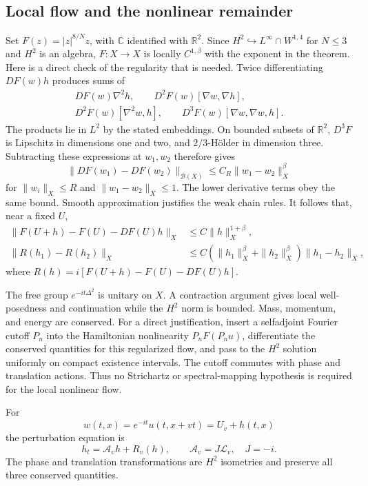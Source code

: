\subsection{Local flow and the nonlinear remainder}

Set $F(z)=|z|^{8/N}z$, with $\mathbb C$ identified with $\mathbb R^2$.
Since $H^2\hookrightarrow L^\infty\cap W^{1,4}$ for $N\le3$ and
$H^2$ is an algebra, $F:X\to X$ is locally $C^{1,\beta}$ with the
exponent in the theorem. Here is a direct check of the regularity that
is needed. Twice differentiating $DF(w)h$ produces sums of
\begin{gather*}
 DF(w)\nabla^2h,\qquad D^2F(w)[\nabla w,\nabla h],\\
 D^2F(w)[\nabla^2w,h],\qquad D^3F(w)[\nabla w,\nabla w,h].
\end{gather*}
The products lie in $L^2$ by the stated embeddings. On bounded subsets
of $\mathbb R^2$, $D^3F$ is Lipschitz in dimensions one and two, and
$2/3$-H\"older in dimension three. Subtracting these expressions at
$w_1,w_2$ therefore gives
\[
 \|DF(w_1)-DF(w_2)\|_{\mathcal B(X)}
       \le C_R\|w_1-w_2\|_X^\beta
\]
for $\|w_i\|_X\le R$ and $\|w_1-w_2\|_X\le1$.
The lower derivative terms obey the same bound. Smooth approximation
justifies the weak chain rules. It follows that, near a fixed $U$,
\begin{align}
 \|F(U+h)-F(U)-DF(U)h\|_X&\le C\|h\|_X^{1+\beta},
 \label{eq:r12-remainder}\\
 \|R(h_1)-R(h_2)\|_X
 &\le C(\|h_1\|_X^\beta+\|h_2\|_X^\beta)\|h_1-h_2\|_X,
 \label{eq:r12-remainder-lipschitz}
\end{align}
where $R(h)=i[F(U+h)-F(U)-DF(U)h]$.

The free group $e^{-it\Delta^2}$ is unitary on $X$. A contraction
argument gives local well-posedness and continuation while the $H^2$
norm is bounded. Mass, momentum, and energy are conserved. For a direct
justification, insert a selfadjoint Fourier cutoff $P_n$ into the
Hamiltonian nonlinearity $P_nF(P_nu)$, differentiate the conserved
quantities for this regularized flow, and pass to the $H^2$ solution
uniformly on compact existence intervals. The cutoff commutes with
phase and translation actions. Thus no Strichartz or spectral-mapping
hypothesis is required for the local nonlinear flow.

For
\[
 w(t,x)=e^{-it}u(t,x+vt)=U_v+h(t,x)
\]
the perturbation equation is
\begin{equation}\label{eq:r12-perturbation-eq}
 h_t=\mathcal A_vh+R_v(h),\qquad
 \mathcal A_v=J\mathcal L_v,\quad J=-i.
\end{equation}
The phase and translation transformations are $H^2$ isometries and
preserve all three conserved quantities.

